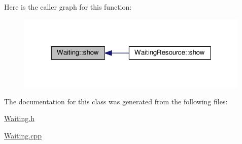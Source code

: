 Here is the caller graph for this function\+:\nopagebreak
\begin{figure}[H]
\begin{center}
\leavevmode
\includegraphics[width=316pt]{class_waiting_aa8b8a3e589f580e3e066a0f9423f4c76_icgraph}
\end{center}
\end{figure}




The documentation for this class was generated from the following files\+:\begin{DoxyCompactItemize}
\item 
\hyperlink{_waiting_8h}{Waiting.\+h}\item 
\hyperlink{_waiting_8cpp}{Waiting.\+cpp}\end{DoxyCompactItemize}
